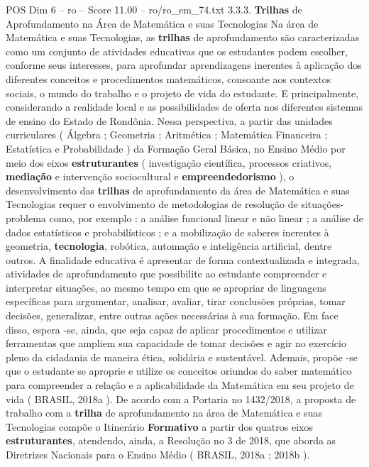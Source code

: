 \begin{textsample}{POS Dim 6 – ro – Score 11.00 – ro/ro\_em\_74.txt}  \label{ex:f6_pos_132}
3.3.3. \textbf{Trilhas} de Aprofundamento na Área de Matemática e suas Tecnologias Na área de Matemática e suas Tecnologias, as \textbf{trilhas} de aprofundamento são caracterizadas como um conjunto de atividades educativas que os estudantes podem escolher, conforme seus interesses, para aprofundar aprendizagens inerentes à aplicação dos diferentes conceitos e procedimentos matemáticos, consoante aos contextos sociais, o mundo do trabalho e o projeto de vida do estudante.
E principalmente, considerando a realidade local e as possibilidades de oferta nos diferentes sistemas de ensino do Estado de Rondônia.
Nessa perspectiva, a partir das unidades curriculares ( Álgebra ; Geometria ; Aritmética ; Matemática Financeira ; Estatística e Probabilidade ) da Formação Geral Básica, no Ensino Médio por meio dos eixos \textbf{estruturantes} ( investigação científica, processos criativos, \textbf{mediação} e intervenção sociocultural e \textbf{empreendedorismo} ), o desenvolvimento das \textbf{trilhas} de aprofundamento da área de Matemática e suas Tecnologias requer o envolvimento de metodologias de resolução de situações-problema como, por exemplo : a análise funcional linear e não linear ; a análise de dados estatísticos e probabilísticos ; e a mobilização de saberes inerentes à geometria, \textbf{tecnologia}, robótica, automação e inteligência artificial, dentre outros.
A finalidade educativa é apresentar de forma contextualizada e integrada, atividades de aprofundamento que possibilite ao estudante compreender e interpretar situações, ao mesmo tempo em que se apropriar de linguagens específicas para argumentar, analisar, avaliar, tirar conclusões próprias, tomar decisões, generalizar, entre outras ações necessárias à sua formação.
Em face disso, espera -se, ainda, que seja capaz de aplicar procedimentos e utilizar ferramentas que ampliem sua capacidade de tomar decisões e agir no exercício pleno da cidadania de maneira ética, solidária e sustentável.
Ademais, propõe -se que o estudante se aproprie e utilize os conceitos oriundos do saber matemático para compreender a relação e a aplicabilidade da Matemática em seu projeto de vida ( BRASIL, 2018a ).
De acordo com a Portaria no 1432/2018, a proposta de trabalho com a \textbf{trilha} de aprofundamento na área de Matemática e suas Tecnologias compõe o Itinerário \textbf{Formativo} a partir dos quatros eixos \textbf{estruturantes}, atendendo, ainda, a Resolução no 3 de 2018, que aborda as Diretrizes Nacionais para o Ensino Médio ( BRASIL, 2018a ; 2018b ).

\end{textsample}
